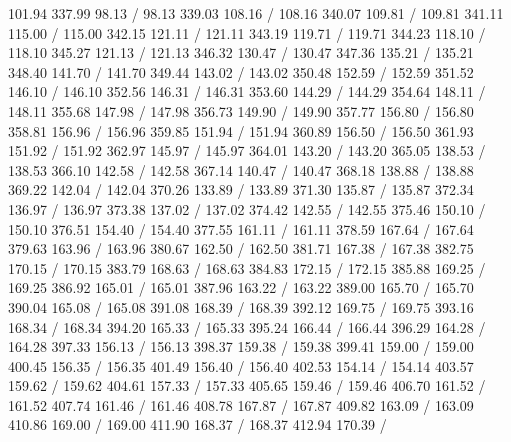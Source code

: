 { 101.94 337.99 98.13 /
 98.13 339.03 108.16 /
 108.16 340.07 109.81 /
 109.81 341.11 115.00 /
 115.00 342.15 121.11 /
 121.11 343.19 119.71 /
 119.71 344.23 118.10 /
 118.10 345.27 121.13 /
 121.13 346.32 130.47 /
 130.47 347.36 135.21 /
 135.21 348.40 141.70 /
 141.70 349.44 143.02 /
 143.02 350.48 152.59 /
 152.59 351.52 146.10 /
 146.10 352.56 146.31 /
 146.31 353.60 144.29 /
 144.29 354.64 148.11 /
 148.11 355.68 147.98 /
 147.98 356.73 149.90 /
 149.90 357.77 156.80 /
 156.80 358.81 156.96 /
 156.96 359.85 151.94 /
 151.94 360.89 156.50 /
 156.50 361.93 151.92 /
 151.92 362.97 145.97 /
 145.97 364.01 143.20 /
 143.20 365.05 138.53 /
 138.53 366.10 142.58 /
 142.58 367.14 140.47 /
 140.47 368.18 138.88 /
 138.88 369.22 142.04 /
 142.04 370.26 133.89 /
 133.89 371.30 135.87 /
 135.87 372.34 136.97 /
 136.97 373.38 137.02 /
 137.02 374.42 142.55 /
 142.55 375.46 150.10 /
 150.10 376.51 154.40 /
 154.40 377.55 161.11 /
 161.11 378.59 167.64 /
 167.64 379.63 163.96 /
 163.96 380.67 162.50 /
 162.50 381.71 167.38 /
 167.38 382.75 170.15 /
 170.15 383.79 168.63 /
 168.63 384.83 172.15 /
 172.15 385.88 169.25 /
 169.25 386.92 165.01 /
 165.01 387.96 163.22 /
 163.22 389.00 165.70 /
 165.70 390.04 165.08 /
 165.08 391.08 168.39 /
 168.39 392.12 169.75 /
 169.75 393.16 168.34 /
 168.34 394.20 165.33 /
 165.33 395.24 166.44 /
 166.44 396.29 164.28 /
 164.28 397.33 156.13 /
 156.13 398.37 159.38 /
 159.38 399.41 159.00 /
 159.00 400.45 156.35 /
 156.35 401.49 156.40 /
 156.40 402.53 154.14 /
 154.14 403.57 159.62 /
 159.62 404.61 157.33 /
 157.33 405.65 159.46 /
 159.46 406.70 161.52 /
 161.52 407.74 161.46 /
 161.46 408.78 167.87 /
 167.87 409.82 163.09 /
 163.09 410.86 169.00 /
 169.00 411.90 168.37 /
 168.37 412.94 170.39 /
}
